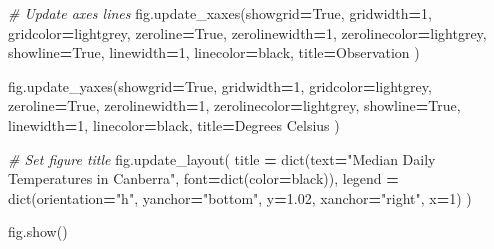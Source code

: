 \documentclass[
  a4paper,
  DIV=11,
  numbers=noendperiod]{scrreprt}
\newenvironment{Shaded}{\begin{snugshade}}{\end{snugshade}}
\newcommand{\BuiltInTok}[1]{#1}
\newcommand{\CommentTok}[1]{\textcolor[rgb]{0.56,0.35,0.01}{\textit{#1}}}
\newcommand{\DecValTok}[1]{\textcolor[rgb]{0.00,0.00,0.81}{#1}}
\newcommand{\FloatTok}[1]{\textcolor[rgb]{0.00,0.00,0.81}{#1}}
\newcommand{\NormalTok}[1]{#1}
\newcommand{\OperatorTok}[1]{\textcolor[rgb]{0.81,0.36,0.00}{\textbf{#1}}}
\newcommand{\StringTok}[1]{\textcolor[rgb]{0.31,0.60,0.02}{#1}}
\newcommand{\VariableTok}[1]{\textcolor[rgb]{0.00,0.00,0.00}{#1}}
\begin{document}
\begin{Shaded}
\begin{Highlighting}[numbers=left,,]
\CommentTok{\# Update axes lines}
\NormalTok{fig.update\_xaxes(showgrid}\OperatorTok{=}\VariableTok{True}\NormalTok{, gridwidth}\OperatorTok{=}\DecValTok{1}\NormalTok{, gridcolor}\OperatorTok{=}\StringTok{\textquotesingle{}lightgrey\textquotesingle{}}\NormalTok{,}
\NormalTok{                 zeroline}\OperatorTok{=}\VariableTok{True}\NormalTok{, zerolinewidth}\OperatorTok{=}\DecValTok{1}\NormalTok{, zerolinecolor}\OperatorTok{=}\StringTok{\textquotesingle{}lightgrey\textquotesingle{}}\NormalTok{,}
\NormalTok{                 showline}\OperatorTok{=}\VariableTok{True}\NormalTok{, linewidth}\OperatorTok{=}\DecValTok{1}\NormalTok{, linecolor}\OperatorTok{=}\StringTok{\textquotesingle{}black\textquotesingle{}}\NormalTok{,}
\NormalTok{                 title}\OperatorTok{=}\StringTok{\textquotesingle{}Observation\textquotesingle{}}
\NormalTok{                )}

\NormalTok{fig.update\_yaxes(showgrid}\OperatorTok{=}\VariableTok{True}\NormalTok{, gridwidth}\OperatorTok{=}\DecValTok{1}\NormalTok{, gridcolor}\OperatorTok{=}\StringTok{\textquotesingle{}lightgrey\textquotesingle{}}\NormalTok{,}
\NormalTok{                 zeroline}\OperatorTok{=}\VariableTok{True}\NormalTok{, zerolinewidth}\OperatorTok{=}\DecValTok{1}\NormalTok{, zerolinecolor}\OperatorTok{=}\StringTok{\textquotesingle{}lightgrey\textquotesingle{}}\NormalTok{,}
\NormalTok{                 showline}\OperatorTok{=}\VariableTok{True}\NormalTok{, linewidth}\OperatorTok{=}\DecValTok{1}\NormalTok{, linecolor}\OperatorTok{=}\StringTok{\textquotesingle{}black\textquotesingle{}}\NormalTok{,}
\NormalTok{                 title}\OperatorTok{=}\StringTok{\textquotesingle{}Degrees Celsius\textquotesingle{}}
\NormalTok{                )}

\CommentTok{\# Set figure title}
\NormalTok{fig.update\_layout(}
\NormalTok{    title }\OperatorTok{=} \BuiltInTok{dict}\NormalTok{(text}\OperatorTok{=}\StringTok{"Median Daily Temperatures in Canberra"}\NormalTok{, font}\OperatorTok{=}\BuiltInTok{dict}\NormalTok{(color}\OperatorTok{=}\StringTok{\textquotesingle{}black\textquotesingle{}}\NormalTok{)),}
\NormalTok{    legend }\OperatorTok{=} \BuiltInTok{dict}\NormalTok{(orientation}\OperatorTok{=}\StringTok{"h"}\NormalTok{, yanchor}\OperatorTok{=}\StringTok{"bottom"}\NormalTok{, y}\OperatorTok{=}\FloatTok{1.02}\NormalTok{, xanchor}\OperatorTok{=}\StringTok{"right"}\NormalTok{, x}\OperatorTok{=}\DecValTok{1}\NormalTok{)}
\NormalTok{)}

\NormalTok{fig.show()}
\end{Highlighting}
\end{Shaded}
\end{document}
